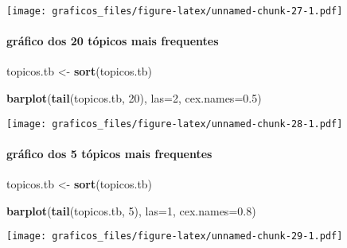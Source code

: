 \documentclass[
]{article}
\newenvironment{Shaded}{\begin{snugshade}}{\end{snugshade}}
\newcommand{\DataTypeTok}[1]{\textcolor[rgb]{0.13,0.29,0.53}{#1}}
\newcommand{\DecValTok}[1]{\textcolor[rgb]{0.00,0.00,0.81}{#1}}
\newcommand{\FloatTok}[1]{\textcolor[rgb]{0.00,0.00,0.81}{#1}}
\newcommand{\KeywordTok}[1]{\textcolor[rgb]{0.13,0.29,0.53}{\textbf{#1}}}
\newcommand{\NormalTok}[1]{#1}
\newcommand{\OperatorTok}[1]{\textcolor[rgb]{0.81,0.36,0.00}{\textbf{#1}}}
\newcommand{\StringTok}[1]{\textcolor[rgb]{0.31,0.60,0.02}{#1}}
\begin{document}
\begin{Shaded}
\end{Shaded}

\texttt{[image: graficos\_files/figure-latex/unnamed-chunk-27-1.pdf]}

\hypertarget{gruxe1fico-dos-20-tuxf3picos-mais-frequentes}{%
\paragraph{gráfico dos 20 tópicos mais
frequentes}\label{gruxe1fico-dos-20-tuxf3picos-mais-frequentes}}

\begin{Shaded}
\begin{Highlighting}[]
\NormalTok{topicos.tb <-}\StringTok{ }\KeywordTok{sort}\NormalTok{(topicos.tb)}

\KeywordTok{barplot}\NormalTok{(}\KeywordTok{tail}\NormalTok{(topicos.tb, }\DecValTok{20}\NormalTok{), }\DataTypeTok{las=}\DecValTok{2}\NormalTok{, }\DataTypeTok{cex.names=}\FloatTok{0.5}\NormalTok{)}
\end{Highlighting}
\end{Shaded}

\texttt{[image: graficos\_files/figure-latex/unnamed-chunk-28-1.pdf]}

\hypertarget{gruxe1fico-dos-5-tuxf3picos-mais-frequentes}{%
\paragraph{gráfico dos 5 tópicos mais
frequentes}\label{gruxe1fico-dos-5-tuxf3picos-mais-frequentes}}

\begin{Shaded}
\begin{Highlighting}[]
\NormalTok{topicos.tb <-}\StringTok{ }\KeywordTok{sort}\NormalTok{(topicos.tb)}

\KeywordTok{barplot}\NormalTok{(}\KeywordTok{tail}\NormalTok{(topicos.tb, }\DecValTok{5}\NormalTok{), }\DataTypeTok{las=}\DecValTok{1}\NormalTok{, }\DataTypeTok{cex.names=}\FloatTok{0.8}\NormalTok{)}
\end{Highlighting}
\end{Shaded}

\texttt{[image: graficos\_files/figure-latex/unnamed-chunk-29-1.pdf]}
\end{document}
